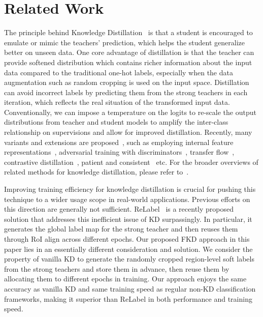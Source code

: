 \documentclass[10pt,twocolumn,letterpaper]{article}
\begin{document}
\section{Related Work}

 The principle behind Knowledge Distillation~\cite{hinton2015distilling} is that a student is encouraged to emulate or mimic the teachers' prediction, which helps the student generalize better on unseen data. One core advantage of distillation is that the teacher can provide softened distribution which contains richer information about the input data compared to the traditional one-hot labels, especially when the data augmentation such as random cropping is used on the input space. Distillation can avoid incorrect labels by predicting them from the strong teachers in each iteration, which reflects the real situation of the transformed input data. Conventionally, we can impose a temperature on the logits to re-scale the output distributions from teacher and student models to amplify the inter-class relationship on supervisions and allow for improved distillation. Recently, many variants and extensions are proposed~\cite{papernot2016distillation,huang2017like,wang2018dataset,zhang2019your,muller2019does,park2019relational,shen2021label,xie2020self,yin2020dreaming,chung2020feature,stanton2021does}, such as employing internal feature representations~\cite{romero2014fitnets}, adversarial training with discriminators~\cite{shen2019meal}, transfer flow~\cite{yim2017gift}, contrastive distillation~\cite{tian2019contrastive}, patient and consistent~\cite{beyer2021knowledge} etc. For the broader overviews of related methods for knowledge distillation, please refer to~\cite{gou2021knowledge,9340578}.

 Improving training efficiency for knowledge distillation is crucial for pushing this technique to a wider usage scope in real-world applications. Previous efforts on this direction are generally not sufficient. ReLabel~\cite{yun2021re} is a recently proposed solution that addresses this inefficient issue of KD surpassingly. In particular, it generates the global label map for the strong teacher and then reuses them through RoI align across different epochs. Our proposed FKD approach in this paper lies in an essentially different consideration and solution. We consider the property of vanilla KD to generate the randomly cropped region-level soft labels from the strong teachers and store them in advance, then reuse them by allocating them to different epochs in training. Our approach enjoys the same accuracy as vanilla KD and same training speed as regular non-KD classification frameworks, making it superior than ReLabel in both performance and training speed. 
\end{document}
